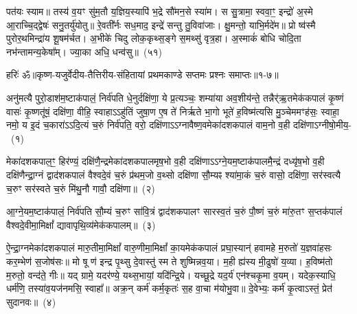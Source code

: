 पत॑यः स्याम॥ तस्य॑ व॒यꣳ सु॑म॒तौ य॒ज्ञिय॒स्यापि॑ भ॒द्रे सौ॑मन॒से स्या॑म। स सु॒त्रामा॒ स्ववा॒ꣳ॒ इन्द्रो॑ अ॒स्मे आ॒राच्चि॒द्द्वेषः॑ सनु॒तर्यु॑योतु॥ रे॒वती᳚र्नः सध॒माद॒ इन्द्रे॑ सन्तु तु॒विवा॑जाः। क्षु॒मन्तो॒ याभि॒र्मदे॑म॥ प्रो ष्व॑स्मै पुरोर॒थमिन्द्रा॑य शू॒षम॑र्चत। अ॒भीके॑ चिदु लोक॒कृथ्स॒ङ्गे स॒मथ्सु॑ वृत्र॒हा। अ॒स्माकं॑ बोधि चोदि॒ता नभ॑न्तामन्य॒केषा᳚म्। ज्या॒का अधि॒ धन्व॑सु॥~(५१)

{\anuvakamend[{ज॒रसा॒ मा ते॑ हर्यश्व सु॒वीर्य॒स्याध्येकं॑ च}]}%

{हरिः॑ ॐ}{॥कृष्ण-यजुर्वेदीय-तैत्तिरीय-संहितायां प्रथमकाण्डे सप्तमः प्रश्नः समाप्तः॥१-७॥}

\setcounter{anuvakam}{0}
अनु॑मत्यै पुरो॒डाश॑\-म॒ष्टा\-क॑पालं॒ निर्व॑पति धे॒नुर्दक्षि॑णा॒ ये प्र॒त्यञ्चः॒ शम्या॑या अव॒शीय॑न्ते॒ तन्नैर्॑ऋ॒तमेक॑कपालं कृ॒ष्णं वासः॑ कृ॒ष्णतू॑षं॒ दक्षि॑णा॒ वीहि॒ स्वाहा\-ऽऽ\-हु॑तिं जुषा॒ण ए॒ष ते॑ निर्\mbox{}ऋते भा॒गो भूते॑ ह॒विष्म॑त्यसि मु॒ञ्चेममꣳह॑सः॒ स्वाहा॒ नमो॒ य इ॒दं च॒कारा॑\-ऽऽ\-दि॒त्यं च॒रुं निर्व॑पति॒ वरो॒ दक्षि॑णा\-ऽऽ\-ग्नावैष्ण॒वमेका॑\-दश\-कपालं वाम॒नो व॒ही दक्षि॑णा\-ऽग्नीषो॒मीय॒-~(१)

मेका॑\-दश\-कपाल॒ꣳ॒ हिर॑ण्यं॒ दक्षि॑णै॒न्द्रमेका॑\-दश\-कपालमृष॒भो व॒ही दक्षि॑णा\-ऽऽ\-ग्ने॒यम॒ष्टाक॑पालमै॒न्द्रं दध्यृ॑ष॒भो व॒ही दक्षि॑णैन्द्रा॒ग्नं द्वाद॑श\-कपालं वैश्वदे॒वं च॒रुं प्र॑थम॒जो व॒थ्सो दक्षि॑णा सौ॒म्यꣴ श्या॑मा॒कं च॒रुं वासो॒ दक्षि॑णा॒ सर॑स्वत्यै च॒रुꣳ सर॑स्वते च॒रुं मि॑थु॒नौ गावौ॒ दक्षि॑णा॥~(२)

{\anuvakamend[{अ॒ग्नी॒षो॒मीयं॒ चतु॑स्त्रिꣳशच्च}]}%

आ॒ग्ने॒यम॒ष्टा\-क॑पालं॒ निर्व॑पति सौ॒म्यं च॒रुꣳ सा॑वि॒त्रं द्वाद॑श\-कपालꣳ सारस्व॒तं च॒रुं पौ॒ष्णं च॒रुं मा॑रु॒तꣳ स॒प्तक॑पालं वैश्वदे॒वीमा॒मिक्षां᳚ द्यावा\-पृथि॒व्य॑मेक॑कपालम्॥~(३)

{\anuvakamend[{आ॒ग्ने॒यम॒ष्टाद॑श}]}%

ऐ॒न्द्रा॒ग्नमेका॑\-दश\-कपालं मारु॒तीमा॒मिक्षां᳚ वारु॒णीमा॒मिक्षां᳚ का॒यमेक॑कपालं प्रघा॒स्यान्॑ हवामहे म॒रुतो॑ य॒ज्ञवा॑हसः कर॒म्भेण॑ स॒जोष॑सः॥ मो षू ण॑ इन्द्र पृ॒थ्सु दे॒वास्तु॑ स्म ते शुष्मिन्नव॒या। म॒ही ह्य॑स्य मी॒ढुषो॑ य॒व्या। ह॒विष्म॑तो म॒रुतो॒ वन्द॑ते॒ गीः॥ यद् ग्रामे॒ यदर॑ण्ये॒ यथ्स॒भायां॒ यदि॑न्द्रि॒ये। यच्छू॒द्रे यद॒र्य॑ एन॑श्चकृ॒मा व॒यम्। यदेक॒स्याधि॒ धर्म॑णि॒ तस्या॑व॒यज॑नमसि॒ स्वाहा᳚॥ अक्र॒न् कर्म॑ कर्म॒कृतः॑ स॒ह वा॒चा म॑योभु॒वा॥ दे॒वेभ्यः॒ कर्म॑ कृ॒त्वा\-ऽस्तं॒ प्रेत॑ सुदानवः॥~(४)

